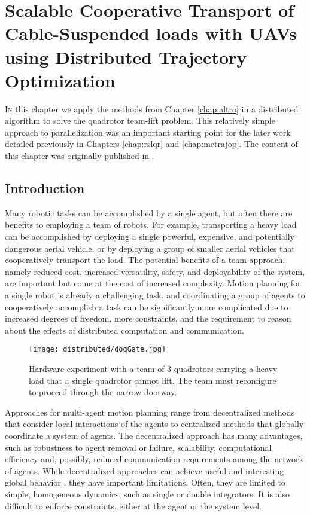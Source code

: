 \documentclass[../root.tex]{subfiles}
\begin{document}
\chapter{
    Scalable Cooperative Transport of Cable-Suspended loads with UAVs using
    Distributed Trajectory Optimization
} \label{chap:distributed}
\lettrine{I}{n} this chapter we apply the methods from Chapter \ref{chap:altro} in a
distributed algorithm to solve the quadrotor team-lift problem. This
relatively simple approach to parallelization was an important starting
point for the later work detailed previously in Chapters \ref{chap:rslqr} and 
\ref{chap:mctrajop}. 
The content of this chapter was originally published in 
\cite{jackson_Scalable_2020}.

\section{Introduction}
Many robotic tasks can be accomplished by a single agent,
but often there are benefits to employing a team of robots. For example,
transporting a heavy load can be accomplished by deploying a single powerful,
expensive, and potentially dangerous aerial vehicle, or by deploying a group
of smaller aerial vehicles that cooperatively transport the load. The
potential benefits of a team approach, namely reduced cost, increased
versatility, safety, and deployability of the system, are important but come
at the cost of increased complexity. Motion planning for a single robot is
already a challenging task, and coordinating a group of agents to
cooperatively accomplish a task can be significantly more complicated due to
increased degrees of freedom, more constraints, and the requirement to reason
about the effects of distributed computation and communication.

\begin{figure}[t]
	\centering
	\texttt{[image: distributed/dogGate.jpg]}
	\caption{Hardware experiment with a team of 3 quadrotors carrying a heavy
	load that a single quadrotor cannot lift. The team must reconfigure to
	proceed through the narrow doorway.}
	\label{fig:x0_hardware}
\end{figure}

Approaches for multi-agent motion planning range from decentralized methods
that consider local interactions of the agents to centralized methods that
globally coordinate a system of agents. The decentralized approach has many
advantages, such as robustness to agent removal or failure, scalability,
computational efficiency and, possibly, reduced communication requirements
among the network of agents. While decentralized approaches can achieve
useful and interesting global behavior 
\cite{cortes_Coverage_2004,krick_Stabilisation_2009,olfati-saber_Consensus_2004,
pimenta_Sensing_2008,vandenberg_Reciprocal_2008},
they have important limitations. Often, they are limited
to simple, homogeneous dynamics, such as single or double integrators. It is
also difficult to enforce constraints, either at the agent or the system
level.
\end{document}
